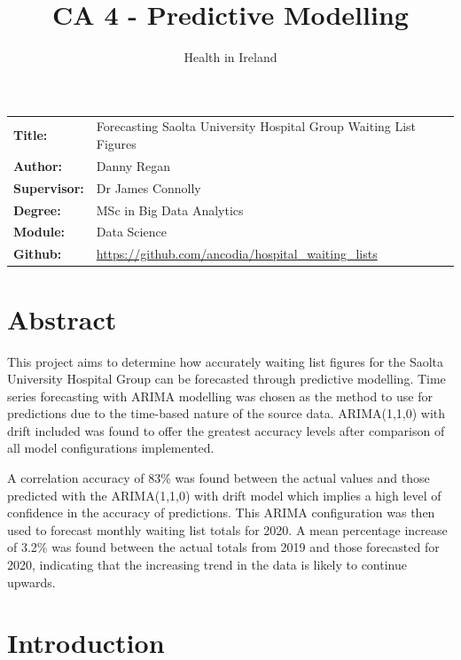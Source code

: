 \documentclass[
  12pt,
]{article}
\title{CA 4 - Predictive Modelling}
\subtitle{Health in Ireland}
\author{}
\date{\vspace{-2.5em}}
\begin{document}
\maketitle

\setcounter{page}{1}
\renewcommand{\arraystretch}{1.5}
\renewcommand{\footnotesize}{\small \justify}

\begingroup
\setlength{\tabcolsep}{15pt} 
\renewcommand{\arraystretch}{1.5} 
  \begin{tabular}[]{@{}ll@{}}
    \bf Title:      & Forecasting Saolta University Hospital Group Waiting List Figures \\
    \bf Author:     & Danny Regan \\
    \bf Supervisor: & Dr James Connolly \\
    \bf Degree:     & MSc in Big Data Analytics \\
    \bf Module:     & Data Science \\
    \bf Github:     & \url{https://github.com/ancodia/hospital_waiting_lists}
  \end{tabular}
\endgroup

\hypertarget{abstract}{%
\section{Abstract}\label{abstract}}

This project aims to determine how accurately waiting list figures for the Saolta University Hospital Group can be forecasted through predictive modelling. Time series forecasting with ARIMA modelling was chosen as the method to use for predictions due to the time-based nature of the source data. ARIMA(1,1,0) with drift included was found to offer the greatest accuracy levels after comparison of all model configurations implemented.

A correlation accuracy of 83\% was found between the actual values and those predicted with the ARIMA(1,1,0) with drift model which implies a high level of confidence in the accuracy of predictions. This ARIMA configuration was then used to forecast monthly waiting list totals for 2020. A mean percentage increase of 3.2\% was found between the actual totals from 2019 and those forecasted for 2020, indicating that the increasing trend in the data is likely to continue upwards.

\newpage

\hypertarget{introduction}{%
\section{Introduction}\label{introduction}}
\end{document}
